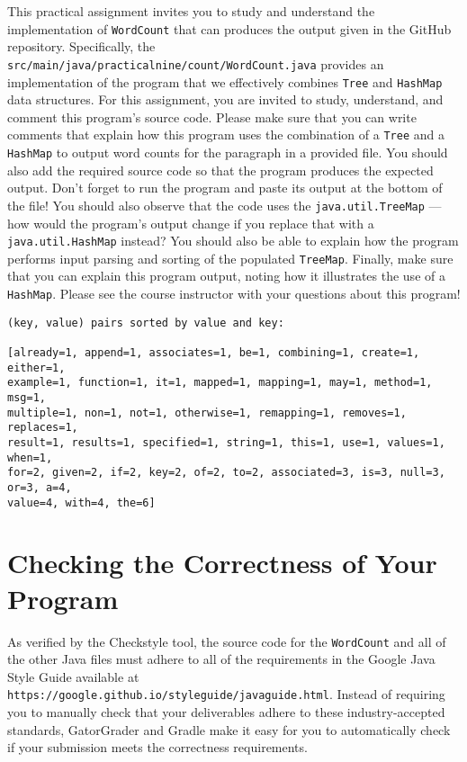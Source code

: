 \documentclass[11pt]{article}
\newcommand{\mainprogram}{\lstinline{WordCount}}
\newcommand{\mainprogramsource}{\lstinline{src/main/java/practicalnine/count/WordCount.java}}
\newcommand{\program}[1]{\lstinline{#1}}
\newcommand{\url}[1]{\lstinline{#1}}
\begin{document}
This practical assignment invites you to study and understand the
implementation of \mainprogram{} that can produces the output given in the
GitHub repository. Specifically, the \mainprogramsource{} provides an
implementation of the program that we effectively combines \program{Tree} and
\program{HashMap} data structures. For this assignment, you are invited to
study, understand, and comment this program's source code. Please make sure
that you can write comments that explain how this program uses the combination
of a \program{Tree} and a \program{HashMap} to output word counts for the
paragraph in a provided file. You should also add the required source code so
that the program produces the expected output. Don't forget to run the program
and paste its output at the bottom of the file! You should also observe that
the code uses the \program{java.util.TreeMap} --- how would the program's
output change if you replace that with a \program{java.util.HashMap} instead?
You should also be able to explain how the program performs input parsing and
sorting of the populated \program{TreeMap}. Finally, make sure that you can
explain this program output, noting how it illustrates the use of a
\program{HashMap}. Please see the course instructor with your questions about
this program!

\begin{verbatim}
(key, value) pairs sorted by value and key:

[already=1, append=1, associates=1, be=1, combining=1, create=1, either=1,
example=1, function=1, it=1, mapped=1, mapping=1, may=1, method=1, msg=1,
multiple=1, non=1, not=1, otherwise=1, remapping=1, removes=1, replaces=1,
result=1, results=1, specified=1, string=1, this=1, use=1, values=1, when=1,
for=2, given=2, if=2, key=2, of=2, to=2, associated=3, is=3, null=3, or=3, a=4,
value=4, with=4, the=6]
\end{verbatim}

\section*{Checking the Correctness of Your Program}

As verified by the Checkstyle tool, the source code for the \mainprogram{} and
all of the other Java files must adhere to all of the requirements in the Google
Java Style Guide available at
\url{https://google.github.io/styleguide/javaguide.html}. Instead of requiring
you to manually check that your deliverables adhere to these industry-accepted
standards, GatorGrader and Gradle make it easy for you to automatically check if
your submission meets the correctness requirements.
\end{document}
